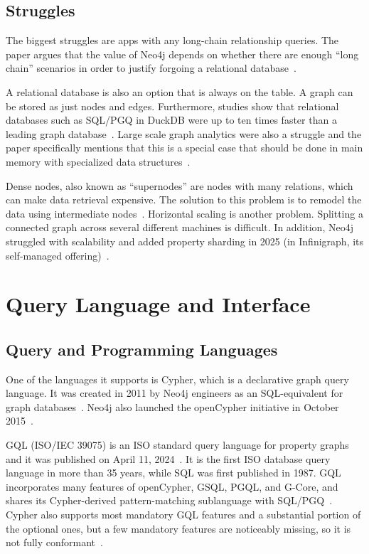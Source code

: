 \documentclass[10pt,a4paper,twocolumn]{article}
\begin{document}
\subsection{Struggles}

The biggest struggles are apps with any long-chain relationship queries. The paper argues that the value of Neo4j depends on whether there are enough ``long chain'' scenarios in order to justify forgoing a relational database~\cite{stonebraker2024whatgoesaround}.

A relational database is also an option that is always on the table. A graph can be stored as just nodes and edges. Furthermore, studies show that relational databases such as SQL/PGQ in DuckDB were up to ten times faster than a leading graph database~\cite{stonebraker2024whatgoesaround}. Large scale graph analytics were also a struggle and the paper specifically mentions that this is a special case that should be done in main memory with specialized data structures~\cite{stonebraker2024whatgoesaround}.

Dense nodes, also known as ``supernodes'' are nodes with many relations, which can make data retrieval expensive. The solution to this problem is to remodel the data using intermediate nodes~\cite{neo4j2026modeling}. Horizontal scaling is another problem. Splitting a connected graph across several different machines is difficult. In addition, Neo4j struggled with scalability and added property sharding in 2025 (in Infinigraph, its self-managed offering)~\cite{clark2025sharding}.

\section{Query Language and Interface}

\subsection{Query and Programming Languages}

One of the languages it supports is Cypher, which is a declarative graph query language. It was created in 2011 by Neo4j engineers as an SQL-equivalent for graph databases~\cite{neo4j2026cypher}. Neo4j also launched the openCypher initiative in October 2015~\cite{malenchino2024opencypher}.

GQL (ISO/IEC 39075) is an ISO standard query language for property graphs and it was published on April 11, 2024~\cite{malenchino2024opencypher,hare2024gql}. It is the first ISO database query language in more than 35 years, while SQL was first published in 1987. GQL incorporates many features of openCypher, GSQL, PGQL, and G-Core, and shares its Cypher-derived pattern-matching sublanguage with SQL/PGQ~\cite{hare2024gql}. Cypher also supports most mandatory GQL features and a substantial portion of the optional ones, but a few mandatory features are noticeably missing, so it is not fully conformant~\cite{neo4j2026gqlconformance}.
\end{document}
